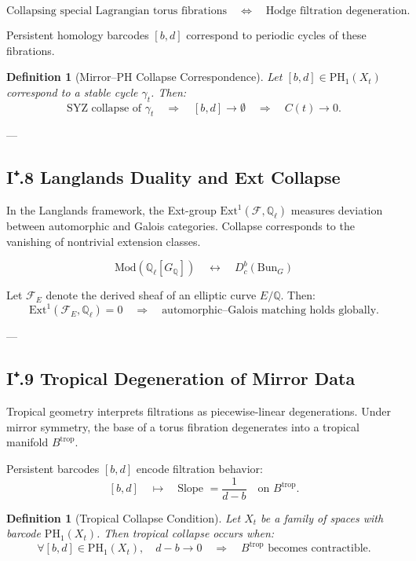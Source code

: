 \documentclass[11pt]{article}
\newtheorem{definition}[theorem]{Definition}
\begin{document}
\[
\text{Collapsing special Lagrangian torus fibrations} 
\quad \Longleftrightarrow \quad 
\text{Hodge filtration degeneration}.
\]

Persistent homology barcodes $[b,d]$ correspond to periodic cycles of these fibrations.

\begin{definition}[Mirror–PH Collapse Correspondence]
Let $[b,d] \in \mathrm{PH}_1(X_t)$ correspond to a stable cycle $\gamma_t$.
Then:
\[
\text{SYZ collapse of } \gamma_t 
\quad \Rightarrow \quad 
[b,d] \to \emptyset \quad \Rightarrow \quad C(t) \to 0.
\]
\end{definition}

---

\subsection*{I⁺.8 Langlands Duality and Ext Collapse}

In the Langlands framework, the Ext-group $\mathrm{Ext}^1(\mathcal{F}, \mathbb{Q}_\ell)$ measures deviation between automorphic and Galois categories.  
Collapse corresponds to the vanishing of nontrivial extension classes.

\[
\text{Mod}(\mathbb{Q}_\ell[G_\mathbb{Q}]) \quad \longleftrightarrow \quad D^b_c(\mathrm{Bun}_G)
\]

\begin{proposition}
Let $\mathcal{F}_E$ denote the derived sheaf of an elliptic curve $E/\mathbb{Q}$.  
Then:
\[
\mathrm{Ext}^1(\mathcal{F}_E, \mathbb{Q}_\ell) = 0 
\quad \Longrightarrow \quad 
\text{automorphic–Galois matching holds globally}.
\]
\end{proposition}

---

\subsection*{I⁺.9 Tropical Degeneration of Mirror Data}

Tropical geometry interprets filtrations as piecewise-linear degenerations.  
Under mirror symmetry, the base of a torus fibration degenerates into a tropical manifold $B^{\mathrm{trop}}$.

Persistent barcodes $[b,d]$ encode filtration behavior:
\[
[b,d] \quad \mapsto \quad \text{Slope } = \frac{1}{d - b} \quad \text{on } B^{\mathrm{trop}}.
\]

\begin{definition}[Tropical Collapse Condition]
Let $X_t$ be a family of spaces with barcode $\mathrm{PH}_1(X_t)$.  
Then tropical collapse occurs when:
\[
\forall [b,d] \in \mathrm{PH}_1(X_t), \quad d - b \to 0 \quad \Rightarrow \quad B^{\mathrm{trop}} \text{ becomes contractible.}
\]
\end{definition}
\end{document}
